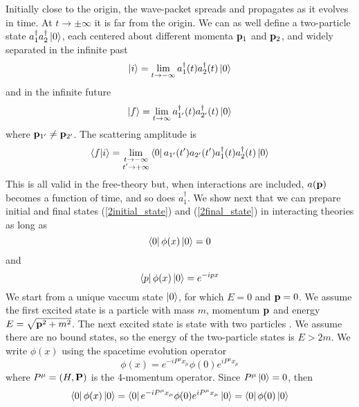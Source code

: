 Initially close to the origin, the wave-packet spreads and propagates as it evolves in time. At $t\to\pm\infty$ it is far from the origin. We can as well define a two-particle state $a^\dagger_1a^\dagger_2\ket{0}$, each centered about different momenta $\vb{p}_1$ and $\vb{p}_2$, and widely separated in the infinite past
\begin{equation}
\ket{i}=\lim_{t\to-\infty}a_1^\dagger(t)a_2^\dagger(t)\ket{0}
\label{2initial_state}
\end{equation}
and in the infinite future
\begin{equation}
\ket{f}=\lim_{t\to\infty}a_{1^\prime}^\dagger(t)a_{2^\prime}^\dagger(t)\ket{0}
\label{2final_state}
\end{equation}
where $\vb{p}_{1^\prime}\neq\vb{p}_{2^\prime}$. The scattering amplitude is
\begin{equation}
    \braket{f}{i}=\lim_{\substack{t\to-\infty\\t^{\prime}\to+\infty}}\bra{0}a_{1^\prime}(t^\prime)a_{2^\prime}(t^\prime)a_1^\dagger(t)a_2^\dagger(t)\ket{0}
    \label{fi}
\end{equation}
This is all valid in the free-theory but, when interactions are included, $a(\vb{p})$ becomes a function of time, and so does $a_1^\dagger$. 
We show next that we can prepare initial and final states (\ref{2initial_state}) and (\ref{2final_state}) in interacting theories  as long as 
\begin{equation}
    \bra{0}\phi(x)\ket{0}=0
    \label{condicao1}
\end{equation}
and
\begin{equation}
    \bra{p}\phi(x)\ket{0}=e^{-ipx}
    \label{condicao2}
\end{equation}
We start from a unique vaccum state $\ket{0}$, for which $E=0$ and $\vb{p}=0$. We assume the first excited state is a particle with mass $m$, momentum $\vb{p}$ and energy $E=\sqrt{\vb{p}^2+m^2}$. The next excited state is state with two particles . We assume there are no bound states, so the energy of the two-particle states is $E>2m$. We write $\phi(x)$ using the spacetime evolution operator
\begin{equation}
    \phi(x)=e^{-iP^\mu x_\mu}\phi(0)e^{iP^\mu x_\mu}
\end{equation}
where $P^\mu=(H,\vb{P})$ is the 4-momentum operator. Since $P^\mu\ket{0}=0$, then
\begin{equation}
     \bra{0}\phi(x)\ket{0}=\bra{0}e^{-iP^\mu x_\mu}\phi(0)e^{iP^\mu x_\mu}\ket{0}=\bra{0}\phi(0)\ket{0}
\end{equation}
